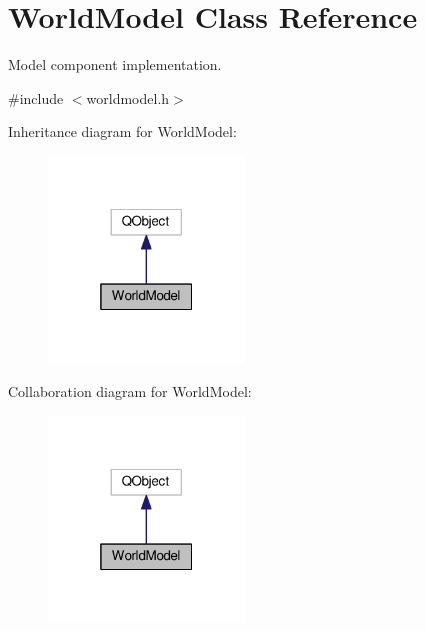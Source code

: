 \hypertarget{classWorldModel}{}\section{World\+Model Class Reference}
\label{classWorldModel}


Model component implementation.  




{\ttfamily \#include $<$worldmodel.\+h$>$}



Inheritance diagram for World\+Model\+:
\nopagebreak
\begin{figure}[H]
\begin{center}
\leavevmode
\includegraphics[width=148pt]{de/d4d/classWorldModel__inherit__graph}
\end{center}
\end{figure}


Collaboration diagram for World\+Model\+:
\nopagebreak
\begin{figure}[H]
\begin{center}
\leavevmode
\includegraphics[width=148pt]{da/dcc/classWorldModel__coll__graph}
\end{center}
\end{figure}
